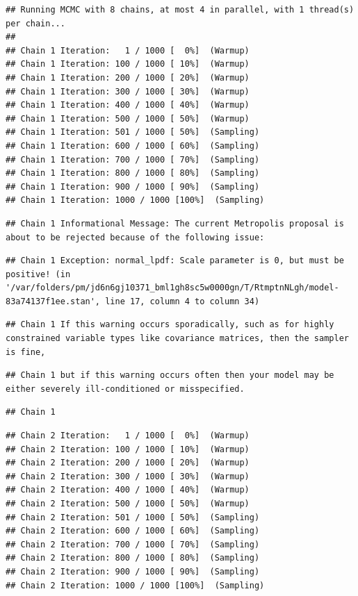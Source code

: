 \documentclass[
]{book}
\begin{document}
\begin{verbatim}
## Running MCMC with 8 chains, at most 4 in parallel, with 1 thread(s) per chain...
## 
## Chain 1 Iteration:   1 / 1000 [  0%]  (Warmup) 
## Chain 1 Iteration: 100 / 1000 [ 10%]  (Warmup) 
## Chain 1 Iteration: 200 / 1000 [ 20%]  (Warmup) 
## Chain 1 Iteration: 300 / 1000 [ 30%]  (Warmup) 
## Chain 1 Iteration: 400 / 1000 [ 40%]  (Warmup) 
## Chain 1 Iteration: 500 / 1000 [ 50%]  (Warmup) 
## Chain 1 Iteration: 501 / 1000 [ 50%]  (Sampling) 
## Chain 1 Iteration: 600 / 1000 [ 60%]  (Sampling) 
## Chain 1 Iteration: 700 / 1000 [ 70%]  (Sampling) 
## Chain 1 Iteration: 800 / 1000 [ 80%]  (Sampling) 
## Chain 1 Iteration: 900 / 1000 [ 90%]  (Sampling) 
## Chain 1 Iteration: 1000 / 1000 [100%]  (Sampling)
\end{verbatim}

\begin{verbatim}
## Chain 1 Informational Message: The current Metropolis proposal is about to be rejected because of the following issue:
\end{verbatim}

\begin{verbatim}
## Chain 1 Exception: normal_lpdf: Scale parameter is 0, but must be positive! (in '/var/folders/pm/jd6n6gj10371_bml1gh8sc5w0000gn/T/RtmptnNLgh/model-83a74137f1ee.stan', line 17, column 4 to column 34)
\end{verbatim}

\begin{verbatim}
## Chain 1 If this warning occurs sporadically, such as for highly constrained variable types like covariance matrices, then the sampler is fine,
\end{verbatim}

\begin{verbatim}
## Chain 1 but if this warning occurs often then your model may be either severely ill-conditioned or misspecified.
\end{verbatim}

\begin{verbatim}
## Chain 1
\end{verbatim}

\begin{verbatim}
## Chain 2 Iteration:   1 / 1000 [  0%]  (Warmup) 
## Chain 2 Iteration: 100 / 1000 [ 10%]  (Warmup) 
## Chain 2 Iteration: 200 / 1000 [ 20%]  (Warmup) 
## Chain 2 Iteration: 300 / 1000 [ 30%]  (Warmup) 
## Chain 2 Iteration: 400 / 1000 [ 40%]  (Warmup) 
## Chain 2 Iteration: 500 / 1000 [ 50%]  (Warmup) 
## Chain 2 Iteration: 501 / 1000 [ 50%]  (Sampling) 
## Chain 2 Iteration: 600 / 1000 [ 60%]  (Sampling) 
## Chain 2 Iteration: 700 / 1000 [ 70%]  (Sampling) 
## Chain 2 Iteration: 800 / 1000 [ 80%]  (Sampling) 
## Chain 2 Iteration: 900 / 1000 [ 90%]  (Sampling) 
## Chain 2 Iteration: 1000 / 1000 [100%]  (Sampling)
\end{verbatim}
\end{document}
